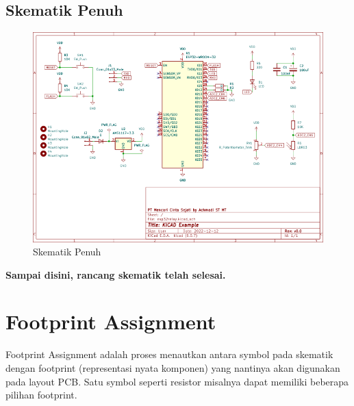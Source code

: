 \documentclass[12pt]{book}
\begin{document}
	\newpage
	\section{Skematik Penuh}

	\begin{figure}[!ht]
		\centering
		\includegraphics[width=\textwidth]{images/sch/esp32relay}
		\caption{Skematik Penuh}
	\end{figure}

	\begin{center}
		\textbf{Sampai disini, rancang skematik telah selesai.}
	\end{center}

	\newpage
	\chapter{Footprint Assignment}

	Footprint Assignment adalah proses menautkan antara symbol pada skematik dengan footprint (representasi nyata komponen)
	yang nantinya akan digunakan pada layout PCB.
	Satu symbol seperti resistor misalnya dapat memiliki beberapa pilihan footprint.
\end{document}
